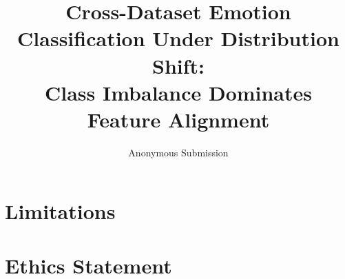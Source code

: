 \documentclass[11pt]{article}
\title{Cross-Dataset Emotion Classification Under Distribution Shift:\\
       Class Imbalance Dominates Feature Alignment}
\author{Anonymous Submission}
\begin{document}
\maketitle

\begin{abstract}

\end{abstract}









\section*{Limitations}


\section*{Ethics Statement}





\clearpage
\appendix

\end{document}
